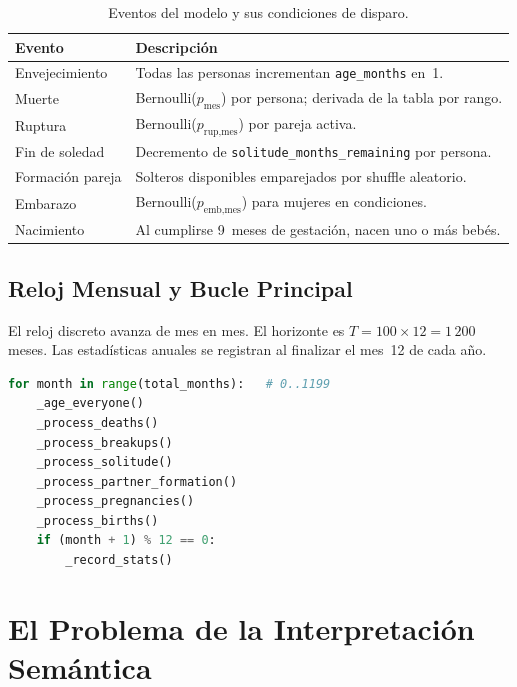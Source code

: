 \documentclass{llncs}
\begin{document}
\begin{table}[H]
\caption{Eventos del modelo y sus condiciones de disparo.}
\label{tab:events}
\centering
\begin{tabular}{lp{7.5cm}}
\toprule
\textbf{Evento} & \textbf{Descripción} \\
\midrule
Envejecimiento   & Todas las personas incrementan \texttt{age\_months} en~1. \\
Muerte           & Bernoulli($p_{\text{mes}}$) por persona; derivada de la tabla por rango. \\
Ruptura          & Bernoulli($p_{\text{rup,mes}}$) por pareja activa. \\
Fin de soledad   & Decremento de \texttt{solitude\_months\_remaining} por persona. \\
Formación pareja & Solteros disponibles emparejados por shuffle aleatorio. \\
Embarazo         & Bernoulli($p_{\text{emb,mes}}$) para mujeres en condiciones. \\
Nacimiento       & Al cumplirse 9~meses de gestación, nacen uno o más bebés. \\
\bottomrule
\end{tabular}
\end{table}

\subsection{Reloj Mensual y Bucle Principal}

El reloj discreto avanza de mes en mes.
El horizonte es $T = 100 \times 12 = 1\,200$ meses.
Las estadísticas anuales se registran al finalizar el mes~12 de cada año.

\begin{lstlisting}[language=Python, caption={Bucle mensual del motor \texttt{step}.}]
for month in range(total_months):   # 0..1199
    _age_everyone()
    _process_deaths()
    _process_breakups()
    _process_solitude()
    _process_partner_formation()
    _process_pregnancies()
    _process_births()
    if (month + 1) % 12 == 0:
        _record_stats()
\end{lstlisting}

\section{El Problema de la Interpretación Semántica}
\label{sec:interpretacion}
\end{document}
